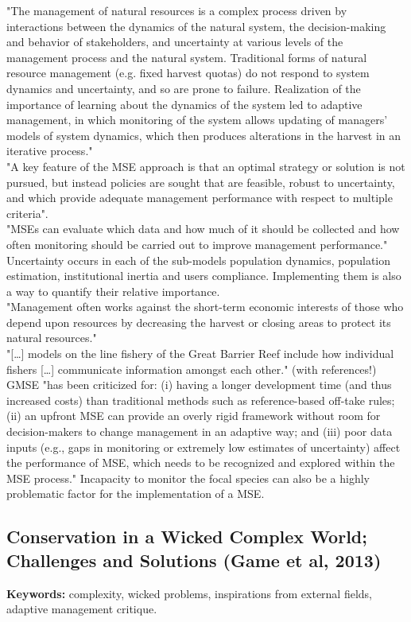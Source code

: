\documentclass[12pt]{article}
\begin{document}
"The management of natural resources is a complex process driven by interactions between the dynamics of the natural system, the decision-making and behavior of stakeholders, and uncertainty at various levels of the management process and the natural system. Traditional forms of natural resource management (e.g. fixed harvest quotas) do not respond to system dynamics and uncertainty, and so are prone to failure. Realization of the importance of learning about the dynamics of the system led to adaptive management, in which monitoring of the system allows updating of managers’ models of system dynamics, which then produces alterations in the harvest in an iterative process."\\
"A key feature of the MSE approach is that an optimal strategy or solution is not pursued, but instead policies are sought that are feasible, robust to uncertainty, and which provide adequate management performance with respect to multiple criteria".\\
"MSEs can evaluate which data and how much of it should be collected and how often monitoring should be carried out to improve management performance."\\
Uncertainty occurs in each of the sub-models population dynamics, population estimation, institutional inertia and users compliance. Implementing them is also a way to quantify their relative importance.\\
"Management often works against the short-term economic interests of those who depend upon resources by decreasing the harvest or closing areas to protect its natural resources."\\
"[\dots] models on the line fishery of the Great Barrier Reef include how individual fishers [\dots] communicate
information amongst each other." (with references!)\\
GMSE "has been criticized for: (i) having a longer development time (and thus increased costs) than traditional methods such as reference-based off-take rules; (ii) an upfront MSE can provide an overly rigid framework without room for decision-makers to change management in an adaptive way; and (iii) poor data inputs (e.g., gaps in monitoring or extremely low estimates of uncertainty) affect the performance of MSE, which needs to be recognized and explored within the MSE process." Incapacity to monitor the focal species can also be a highly problematic factor for the implementation of a MSE.

\subsection{Conservation in a Wicked Complex World; Challenges and Solutions (Game et al, 2013)}
\textbf{Keywords:} complexity, wicked problems, inspirations from external fields, adaptive management critique.
\end{document}
